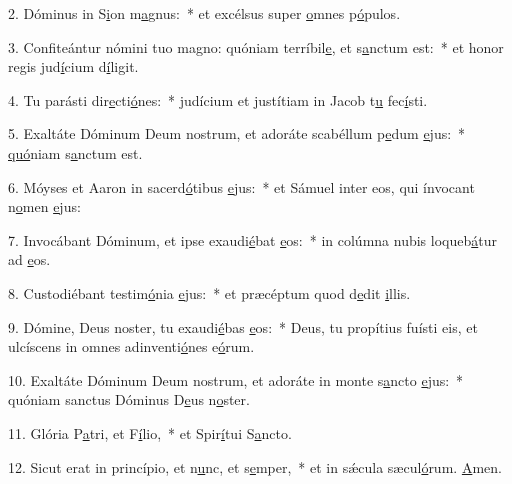 2. Dóminus in S\uline{i}on m\uline{a}gnus:~* et excélsus super \uline{o}mnes p\uline{ó}pulos.\par 
3. Confiteántur nómini tuo magno: quóniam terríbil\uline{e}, et s\uline{a}nctum est:~* et honor regis jud\uline{í}cium d\uline{í}ligit.\par 
4. Tu parásti dir\uline{e}cti\uline{ó}nes:~* judícium et justítiam in Jacob t\uline{u} fec\uline{í}sti.\par 
5. Exaltáte Dóminum Deum nostrum, et adoráte scabéllum p\uline{e}dum \uline{e}jus:~* \uline{quó}niam s\uline{a}nctum est.\par 
6. Móyses et Aaron in sacerd\uline{ó}tibus \uline{e}jus:~* et Sámuel inter eos, qui ínvocant n\uline{o}men \uline{e}jus:\par 
7. Invocábant Dóminum, et ipse exaudi\uline{é}bat \uline{e}os:~* in colúmna nubis loqueb\uline{á}tur ad \uline{e}os.\par 
8. Custodiébant testim\uline{ó}nia \uline{e}jus:~* et præcéptum quod d\uline{e}dit \uline{i}llis.\par 
9. Dómine, Deus noster, tu exaudi\uline{é}bas \uline{e}os:~* Deus, tu propítius fuísti eis, et ulcíscens in omnes adinventi\uline{ó}nes e\uline{ó}rum.\par 
10. Exaltáte Dóminum Deum nostrum, et adoráte in monte s\uline{a}ncto \uline{e}jus:~* quóniam sanctus Dóminus D\uline{e}us n\uline{o}ster.\par 
11. Glória P\uline{a}tri, et F\uline{í}lio,~* et Spir\uline{í}tui S\uline{a}ncto.\par 
12. Sicut erat in princípio, et n\uline{u}nc, et s\uline{e}mper,~* et in sǽcula sæcul\uline{ó}rum. \uline{A}men.\par 
